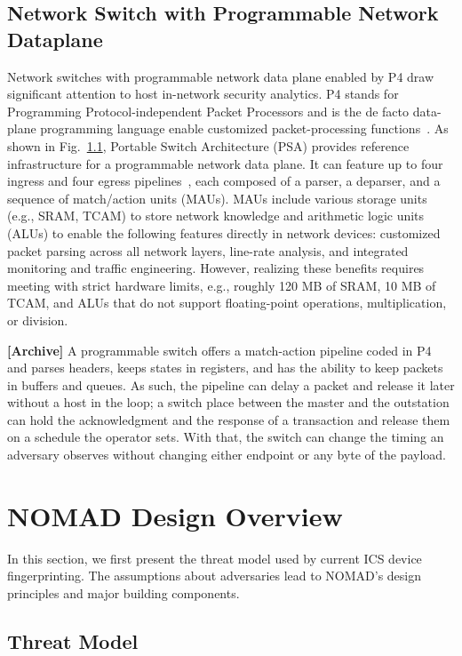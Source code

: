 \documentclass[conference]{IEEEtran}
\begin{document}
\subsection{Network Switch with Programmable Network Dataplane}
Network switches with programmable network data plane enabled by P4 draw significant attention to host in-network security analytics. P4 stands for Programming Protocol-independent Packet Processors and is the de facto data-plane programming language enable customized packet-processing functions~\cite{p4ccr2014}. 
As shown in Fig.~\ref{}, Portable Switch Architecture (PSA) provides reference infrastructure for a programmable network data plane. It can feature up to four ingress and four egress pipelines~\cite{p42022psa}, each composed of a parser, a deparser, and a sequence of match/action units (MAUs). MAUs include various storage units (e.g., SRAM, TCAM) to store network knowledge and arithmetic logic units (ALUs) to enable the following features directly in network devices: customized packet parsing across all network layers, line-rate analysis, and integrated monitoring and traffic engineering. However, realizing these benefits requires meeting with strict hardware limits, e.g., roughly 120 MB of SRAM, 10 MB of TCAM, and ALUs that do not support floating-point operations, multiplication, or division. 

\textbf{[Archive]} A programmable switch offers a match-action pipeline coded in P4~\cite{p4ccr2014} and parses headers, keeps states in registers, and has the ability to keep packets in buffers and queues. As such, the pipeline can delay a packet and release it later without a host in the loop; a switch place between the master and the outstation can hold the acknowledgment and the response of a transaction and release them on a schedule the operator sets. With that, the switch can change the timing an adversary observes without changing either endpoint or any byte of the payload.


\section{NOMAD Design Overview}
In this section, we first present the threat model used by current ICS device fingerprinting. The assumptions about adversaries lead to NOMAD's design principles and major building components. 
\subsection{Threat Model}
\end{document}
